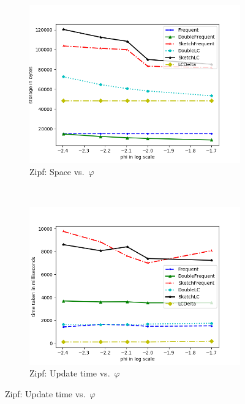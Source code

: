\documentclass[sigconf,review=true,anonymous=true,screen]{acmart}
\renewcommand{\phi}{\varphi}
\begin{document}
\begin{figure}
\centering
\begin{subfigure}[b]{0.3\textwidth}
\includegraphics[width=\textwidth]{../Plots/storage_phiskew.png}
\caption{Zipf: Space vs.~$\phi$}
\end{subfigure}
~
\begin{subfigure}[b]{0.3\textwidth}
\includegraphics[width=\textwidth]{../Plots/time_phiskew.png}
\caption{Zipf: Update time vs.~$\phi$}
\end{subfigure}


\end{figure}
\end{document}
